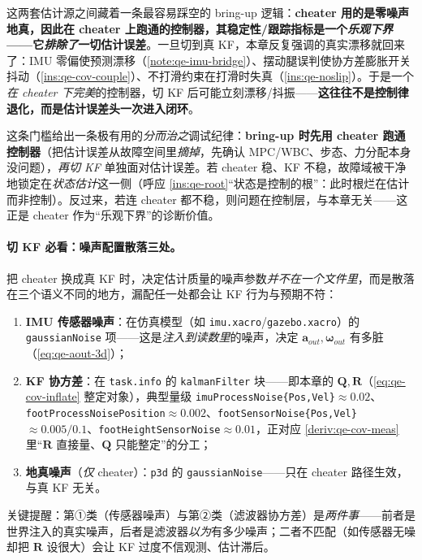 \begin{insight}\label{ins:qe-cheater-gate}
这两套估计源之间藏着一条最容易踩空的 bring-up 逻辑：\textbf{cheater 用的是零噪声地真，因此在 cheater 上跑通的控制器，其稳定性/跟踪指标是一个\emph{乐观下界}——它\emph{排除了}一切估计误差}。一旦切到真 KF，本章反复强调的真实漂移就回来了：IMU 零偏使预测漂移（\cref{note:qe-imu-bridge}）、摆动腿误判使协方差膨胀开关抖动（\cref{ins:qe-cov-couple}）、不打滑约束在打滑时失真（\cref{ins:qe-noslip}）。于是一个\emph{在 cheater 下完美}的控制器，切 KF 后可能立刻漂移/抖振——\textbf{这往往不是控制律退化，而是估计误差头一次进入闭环}。

这条门槛给出一条极有用的\emph{分而治之}调试纪律：\textbf{bring-up 时先用 cheater 跑通控制器}（把估计误差从故障空间里\emph{摘掉}，先确认 MPC/WBC、步态、力分配本身没问题），\emph{再切 KF} 单独面对估计误差。若 cheater 稳、KF 不稳，故障域被干净地锁定在\emph{状态估计}这一侧（呼应 \cref{ins:qe-root}“状态是控制的根”：此时根烂在估计而非控制）。反过来，若连 cheater 都不稳，则问题在控制层，与本章无关——这正是 cheater 作为“乐观下界”的诊断价值。
\end{insight}

\paragraph{切 KF 必看：噪声配置散落三处。}
把 cheater 换成真 KF 时，决定估计质量的噪声参数\emph{并不在一个文件里}，而是散落在三个语义不同的地方，漏配任一处都会让 KF 行为与预期不符：
\begin{enumerate}
  \item \textbf{IMU 传感器噪声}：在仿真模型（如 \texttt{imu.xacro}/\texttt{gazebo.xacro}）的 \texttt{gaussianNoise} 项——这是\emph{注入到读数里}的噪声，决定 $\boldsymbol a_{out},\boldsymbol\omega_{out}$ 有多脏（\cref{eq:qe-aout-3d}）；
  \item \textbf{KF 协方差}：在 \texttt{task.info} 的 \texttt{kalmanFilter} 块——即本章的 $\mathbf{Q},\mathbf{R}$（\cref{eq:qe-cov-inflate} 整定对象），典型量级 \texttt{imuProcessNoise\{Pos,Vel\}}$\approx0.02$、\texttt{footProcessNoisePosition}$\approx0.002$、\texttt{footSensorNoise\{Pos,Vel\}}$\approx0.005/0.1$、\texttt{footHeightSensorNoise}$\approx0.01$，正对应 \cref{deriv:qe-cov-meas} 里“$\mathbf{R}$ 直接量、$\mathbf{Q}$ 只能整定”的分工；
  \item \textbf{地真噪声}（\emph{仅} cheater）：\texttt{p3d} 的 \texttt{gaussianNoise}——只在 cheater 路径生效，与真 KF 无关。
\end{enumerate}
关键提醒：第①类（传感器噪声）与第②类（滤波器协方差）是\emph{两件事}——前者是世界注入的真实噪声，后者是滤波器\emph{以为}有多少噪声；二者不匹配（如传感器无噪却把 $\mathbf{R}$ 设很大）会让 KF 过度不信观测、估计滞后。

